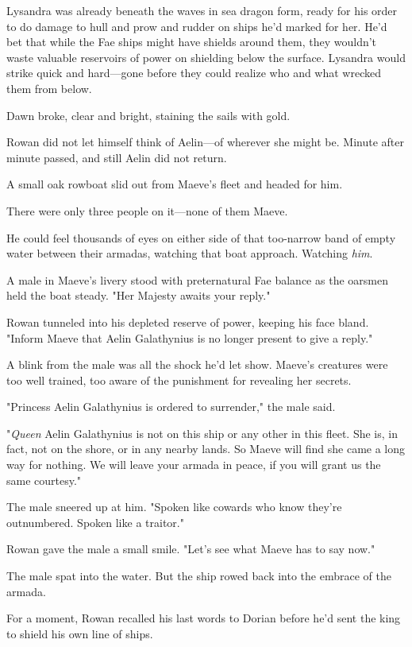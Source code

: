 Lysandra was already beneath the waves in sea dragon form, ready for his order to do damage to hull and prow and rudder on ships he'd marked for her.
He'd bet that while the Fae ships might have shields around them, they wouldn't waste valuable reservoirs of power on shielding below the surface.
Lysandra would strike quick and hard---gone before they could realize who and what wrecked them from below.

Dawn broke, clear and bright, staining the sails with gold.

Rowan did not let himself think of Aelin---of wherever she might be.
Minute after minute passed, and still Aelin did not return.

A small oak rowboat slid out from Maeve's fleet and headed for him.

There were only three people on it---none of them Maeve.

He could feel thousands of eyes on either side of that too-narrow band of empty water between their armadas, watching that boat approach.
Watching \emph{him}.

A male in Maeve's livery stood with preternatural Fae balance as the oarsmen held the boat steady.
"Her Majesty awaits your reply."

Rowan tunneled into his depleted reserve of power, keeping his face bland.
"Inform Maeve that Aelin Galathynius is no longer present to give a reply."

A blink from the male was all the shock he'd let show.
Maeve's creatures were too well trained, too aware of the punishment for revealing her secrets.

"Princess Aelin Galathynius is ordered to surrender," the male said.

"\emph{Queen} Aelin Galathynius is not on this ship or any other in this fleet.
She is, in fact, not on the shore, or in any nearby lands.
So Maeve will find she came a long way for nothing.
We will leave your armada in peace, if you will grant us the same courtesy."

The male sneered up at him.
"Spoken like cowards who know they're outnumbered.
Spoken like a traitor."

Rowan gave the male a small smile.
"Let's see what Maeve has to say now."

The male spat into the water.
But the ship rowed back into the embrace of the armada.

For a moment, Rowan recalled his last words to Dorian before he'd sent the king to shield his own line of ships.

